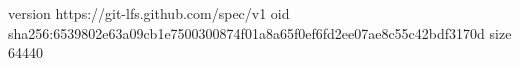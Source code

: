 version https://git-lfs.github.com/spec/v1
oid sha256:6539802e63a09cb1e7500300874f01a8a65f0ef6fd2ee07ae8c55c42bdf3170d
size 64440
